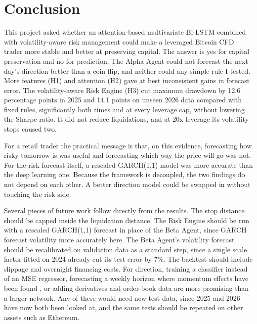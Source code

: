 \section{Conclusion}\label{sec:conclusion}

This project asked whether an attention-based multivariate Bi-LSTM combined with volatility-aware risk management could make a leveraged Bitcoin CFD trader more stable and better at preserving capital. The answer is yes for capital preservation and no for prediction. The Alpha Agent could not forecast the next day's direction better than a coin flip, and neither could any simple rule I tested. More features (H1) and attention (H2) gave at best inconsistent gains in forecast error. The volatility-aware Risk Engine (H3) cut maximum drawdown by 12.6 percentage points in 2025 and 14.1 points on unseen 2026 data compared with fixed rules, significantly both times and at every leverage cap, without lowering the Sharpe ratio. It did not reduce liquidations, and at 20x leverage its volatility stops caused two.

For a retail trader the practical message is that, on this evidence, forecasting how risky tomorrow is was useful and forecasting which way the price will go was not. For the risk forecast itself, a rescaled GARCH(1,1) model was more accurate than the deep learning one. Because the framework is decoupled, the two findings do not depend on each other. A better direction model could be swapped in without touching the risk side.

Several pieces of future work follow directly from the results. The stop distance should be capped inside the liquidation distance. The Risk Engine should be run with a rescaled GARCH(1,1) forecast in place of the Beta Agent, since GARCH forecast volatility more accurately here. The Beta Agent's volatility forecast should be recalibrated on validation data as a standard step, since a single scale factor fitted on 2024 already cut its test error by 7\%. The backtest should include slippage and overnight financing costs. For direction, training a classifier instead of an MSE regressor, forecasting a weekly horizon where momentum effects have been found \cite{liu2021}, or adding derivatives and order-book data are more promising than a larger network. Any of these would need new test data, since 2025 and 2026 have now both been looked at, and the same tests should be repeated on other assets such as Ethereum.
